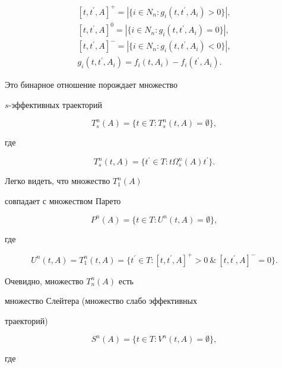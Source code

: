 \begin{gather*}


[t,t^{\prime},A]^+ = |\{i \in N_n  : g_i(t,t^{\prime},A_i) >0\}|, \\


[t,t^{\prime},A]^0 = |\{i \in N_n :


g_i(t,t^{\prime},A_i) = 0\}|,\\


[t,t^{\prime},A]^- = |\{i \in N_n


: g_i(t,t^{\prime},A_i) < 0\}|,\\


g_i(t,t^{\prime},A_i)=f_i(t,A_i)-f_i(t^{\prime},A_i).


\end{gather*}





Это бинарное отношение порождает множество


$s$-эффективных траекторий


$$


T^n_s(A)=\{t \in T : T^n_s(t,A)=\emptyset\},


$$


где


$$


T^n_s(t,A)=\{t^{\prime}\in T : t \Omega^n_s(A) t^{\prime}\}.


$$





Легко видеть, что множество $T^n_1(A)$


совпадает с множеством Парето


$$


P^n(A)=\{t\in T : U^n(t,A)=\emptyset\},


$$


где


$$


U^n(t,A)=T^n_1(t,A)=\{t^{\prime}\in T :


[t,t^{\prime},A]^+>0\  \&\  [t,t^{\prime},A]^-=0\}.


$$


Очевидно, множество $T^n_n(A)$ есть


множество Слейтера (множество слабо эффективных


траекторий)


$$


S^n(A)=\{t\in T  :  V^n(t,A)=\emptyset\},


$$


где


